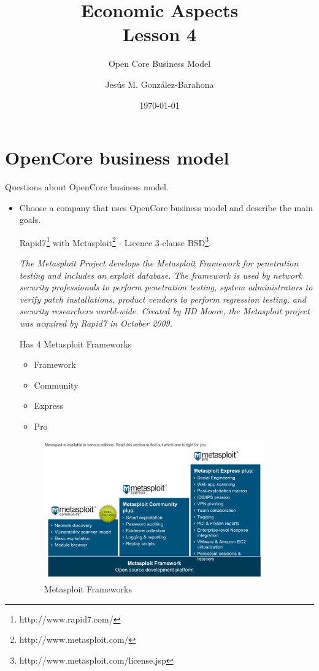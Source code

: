 \documentclass[11pt]{scrartcl}
\title{\textbf{Economic Aspects\\
                Lesson 4}}
\subtitle{Open Core Business Model}
\author{Jesús M. González-Barahona}
\date{\today}
\begin{document}
\maketitle

\section{OpenCore business model}

Questions about OpenCore business model.

\begin{itemize}

\item Choose a company that uses OpenCore business model and describe the main goals.

\par Rapid7\footnote{http://www.rapid7.com/} with Metasploit\footnote{http://www.metasploit.com/} - Licence 3-clause BSD\footnote{http://www.metasploit.com/license.jsp}.

\emph{The Metasploit Project develops the Metasploit Framework for penetration testing and includes an exploit database. The framework is used by network security professionals to perform penetration testing, system administrators to verify patch installations, product vendors to perform regression testing, and security researchers world-wide. Created by HD Moore, the Metasploit project was acquired by Rapid7 in October 2009.}

\par Has 4 Metasploit Frameworks

\begin{itemize}
    \item Framework
    \item Community
    \item Express
    \item Pro
\end{itemize}

\begin{figure}[H]
    \begin{center}
        \includegraphics[width=0.9\textwidth]{images/metasploit-frameworks.png}
        \caption{Metasploit Frameworks}
        \label{fig:metasploit-fw}
    \end{center}
\end{figure}


\end{itemize}
\end{document}
